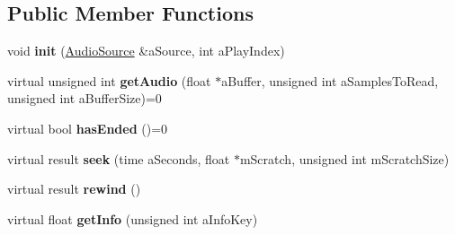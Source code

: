 \subsection*{Public Member Functions}
\begin{DoxyCompactItemize}
\item 
\mbox{\label{class_so_loud_1_1_audio_source_instance_aeb5f60467d4cf4837e8dab58569b3ad2}} 
void {\bfseries init} (\mbox{\hyperlink{class_so_loud_1_1_audio_source}{Audio\+Source}} \&a\+Source, int a\+Play\+Index)
\item 
\mbox{\label{class_so_loud_1_1_audio_source_instance_a3e5989f645633ec2f7e7c3c35c919a4a}} 
virtual unsigned int {\bfseries get\+Audio} (float $\ast$a\+Buffer, unsigned int a\+Samples\+To\+Read, unsigned int a\+Buffer\+Size)=0
\item 
\mbox{\label{class_so_loud_1_1_audio_source_instance_a49b7277a667ff7b49c6e59941f2ee98c}} 
virtual bool {\bfseries has\+Ended} ()=0
\item 
\mbox{\label{class_so_loud_1_1_audio_source_instance_a2899ea546bc234175f8f144bc11e5252}} 
virtual result {\bfseries seek} (time a\+Seconds, float $\ast$m\+Scratch, unsigned int m\+Scratch\+Size)
\item 
\mbox{\label{class_so_loud_1_1_audio_source_instance_a5358006432f91affa6f679c3727aba2c}} 
virtual result {\bfseries rewind} ()
\item 
\mbox{\label{class_so_loud_1_1_audio_source_instance_ab21d2fbf6e0200bb377755c00c71a450}} 
virtual float {\bfseries get\+Info} (unsigned int a\+Info\+Key)
\end{DoxyCompactItemize}
